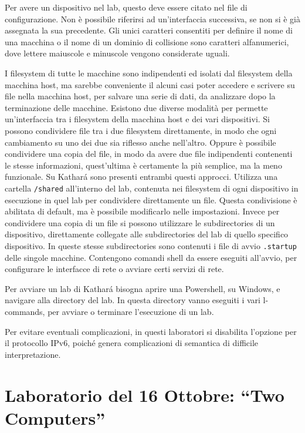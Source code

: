 \documentclass{article}
\numberwithin{equation}{subsection}
\begin{document}
Per avere un dispositivo nel lab, questo deve essere citato nel file di configurazione. Non è possibile riferirsi ad un'interfaccia successiva, se non si è già assegnata la sua precedente. Gli unici caratteri 
consentiti per definire il nome di una macchina o il nome di un dominio di collisione sono caratteri alfanumerici, dove lettere maiuscole e minuscole vengono considerate uguali. 

I filesystem di tutte le macchine sono indipendenti ed isolati dal filesystem della macchina host, ma sarebbe conveniente il alcuni casi poter accedere e scrivere su file nella macchina host, per salvare una 
serie di dati, da analizzare dopo la terminazione delle macchine. 
Esistono due diverse modalità per permette un'interfaccia tra i filesystem della macchina host e dei vari dispositivi. Si possono condividere file tra i due filesystem direttamente, in modo che ogni cambiamento 
su uno dei due sia riflesso anche nell'altro. Oppure è possibile condividere una copia del file, in modo da avere due file indipendenti contenenti le stesse informazioni, quest'ultima è certamente la più 
semplice, ma la meno funzionale. 
Su Kathar\'{a} sono presenti entrambi questi approcci. Utilizza una cartella \verb|/shared| all'interno del lab, contenuta nei filesystem di ogni dispositivo in esecuzione in quel lab per condividere direttamente 
un file. Questa condivisione è abilitata di default, ma è possibile modificarlo nelle impostazioni. Invece per condividere una copia di un file si possono utilizzare le subdirectories di un dispositivo, direttamente 
collegate alle subdirectories del lab di quello specifico dispositivo. 
In queste stesse subdirectories sono contenuti i file di avvio \verb|.startup| delle singole macchine. Contengono comandi shell da essere eseguiti all'avvio, per configurare le interfacce di rete o avviare 
certi servizi di rete. 

Per avviare un lab di Kathar\'{a} bisogna aprire una Powershell, su Windows, e navigare alla directory del lab. In questa directory vanno eseguiti i vari l-commands, per avviare o terminare l'esecuzione di un lab. 

Per evitare eventuali complicazioni, in questi laboratori si disabilita l'opzione per il protocollo IPv6, poiché genera complicazioni di semantica di difficile interpretazione. 

\clearpage

\section{Laboratorio del 16 Ottobre: ``Two Computers''}
\end{document}
